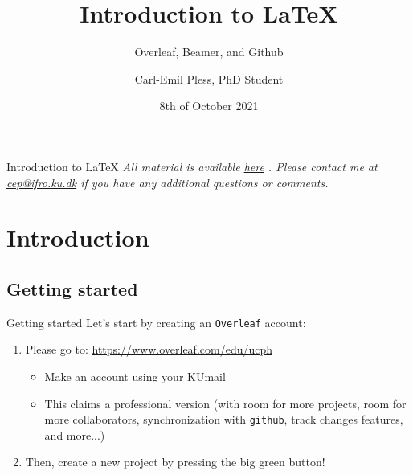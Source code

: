 \documentclass[10pt]{beamer}
\title{Introduction to \LaTeX}
\subtitle{Overleaf, Beamer, and Github}
\author{Carl-Emil Pless, PhD Student}
\institute{Department of Food and Resource Economics \\ The University of Copenhagen}
\date{8th of October 2021}
\begin{document}
\maketitle

\begin{frame}{Introduction to \LaTeX}
    \emph{All material is available \href{https://github.com/carlepless/latex-introduction}{\color{blue}here} . Please contact me at \href{mailto: cep@ifro.ku.dk}{\color{blue}cep@ifro.ku.dk} if you have any additional questions or comments.} 
    \tableofcontents    
\end{frame}

\section{Introduction}

\subsection{Getting started}
\begin{frame}{Getting started}
    \alert{Let's start by creating an \texttt{Overleaf} account:}
    \begin{enumerate}
        \item Please go to: \href{https://www.overleaf.com/edu/ucph}{\color{blue}https://www.overleaf.com/edu/ucph}
        \begin{itemize}
            \item Make an account using your KUmail 
            \item This claims a professional version (with room for more projects, room for more collaborators, synchronization with \texttt{github}, track changes features, and more...)
        \end{itemize}
        \item Then, create a new project by pressing the big green button!
    \end{enumerate} 
\end{frame}
\end{document}
